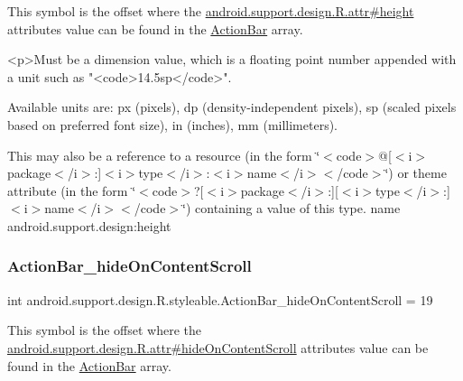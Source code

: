 This symbol is the offset where the \hyperlink{classandroid_1_1support_1_1design_1_1R_1_1attr_a9f0ba1ff755eae97d0aaf956a1f3438b}{android.\+support.\+design.\+R.\+attr\#height} attribute\textquotesingle{}s value can be found in the \hyperlink{classandroid_1_1support_1_1design_1_1R_1_1styleable_ab795220a96557d11f8c21359b95bed82}{Action\+Bar} array.

\begin{DoxyVerb}      <p>Must be a dimension value, which is a floating point number appended with a unit such as "<code>14.5sp</code>".
\end{DoxyVerb}
 Available units are\+: px (pixels), dp (density-\/independent pixels), sp (scaled pixels based on preferred font size), in (inches), mm (millimeters). 

This may also be a reference to a resource (in the form \char`\"{}$<$code$>$@\mbox{[}$<$i$>$package$<$/i$>$\+:\mbox{]}$<$i$>$type$<$/i$>$\+:$<$i$>$name$<$/i$>$$<$/code$>$\char`\"{}) or theme attribute (in the form \char`\"{}$<$code$>$?\mbox{[}$<$i$>$package$<$/i$>$\+:\mbox{]}\mbox{[}$<$i$>$type$<$/i$>$\+:\mbox{]}$<$i$>$name$<$/i$>$$<$/code$>$\char`\"{}) containing a value of this type.  name android.\+support.\+design\+:height \mbox{\label{classandroid_1_1support_1_1design_1_1R_1_1styleable_aaacf39cc520445677c982038b3f1c151}} 
\subsubsection{\texorpdfstring{Action\+Bar\+\_\+hide\+On\+Content\+Scroll}{ActionBar\_hideOnContentScroll}}
{\footnotesize\ttfamily int android.\+support.\+design.\+R.\+styleable.\+Action\+Bar\+\_\+hide\+On\+Content\+Scroll = 19\hspace{0.3cm}{\ttfamily [static]}}

This symbol is the offset where the \hyperlink{classandroid_1_1support_1_1design_1_1R_1_1attr_a3a471e653f9beeccab7aa3f54464f4ab}{android.\+support.\+design.\+R.\+attr\#hide\+On\+Content\+Scroll} attribute\textquotesingle{}s value can be found in the \hyperlink{classandroid_1_1support_1_1design_1_1R_1_1styleable_ab795220a96557d11f8c21359b95bed82}{Action\+Bar} array.

